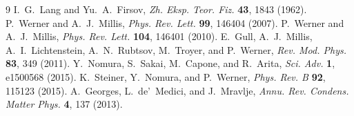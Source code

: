 \documentclass[a4paper,12pt]{article}
\begin{document}
\begin{thebibliography}{9}
 I.~G.~Lang and Yu.~A.~Firsov, \emph{Zh. Eksp. Teor. Fiz.}
  \textbf{43}, 1843 (1962).
 P.~Werner and A.~J.~Millis, \emph{Phys. Rev. Lett.}
  \textbf{99}, 146404 (2007).
 P.~Werner and A.~J.~Millis, \emph{Phys. Rev. Lett.}
  \textbf{104}, 146401 (2010).
 E.~Gull, A.~J.~Millis, A.~I.~Lichtenstein, A.~N.~Rubtsov,
  M.~Troyer, and P.~Werner, \emph{Rev. Mod. Phys.} \textbf{83}, 349 (2011).
 Y.~Nomura, S.~Sakai, M.~Capone, and R.~Arita, \emph{Sci. Adv.}
  \textbf{1}, e1500568 (2015).
 K.~Steiner, Y.~Nomura, and P.~Werner, \emph{Phys. Rev. B}
  \textbf{92}, 115123 (2015).
 A.~Georges, L.~de'~Medici, and J.~Mravlje, \emph{Annu. Rev.
  Condens. Matter Phys.} \textbf{4}, 137 (2013).
\end{thebibliography}
\end{document}
